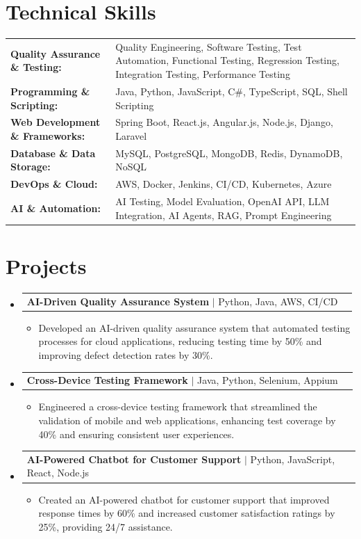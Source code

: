\documentclass[letterpaper,10pt]{article}
\makeatletter
\newcommand{\resumeItem}[1]{
  \item{\fontsize{8pt}{9pt}\selectfont
    #1 \vspace{-3pt}
  }
}
\newcommand{\resumeProjectHeading}[2]{
    \item
    \begin{tabular*}{1.001\textwidth}{l@{\extracolsep{\fill}}r}
      \fontsize{8.5pt}{10pt}#1 & \textbf{\fontsize{8.5pt}{10pt} #2}\\
    \end{tabular*}\vspace{-7pt}
}
\newcommand{\resumeSubHeadingListStart}{\begin{itemize}[leftmargin=0pt, label={}]}
\newcommand{\resumeSubHeadingListEnd}{\end{itemize}}
\newcommand{\resumeItemListStart}{\begin{itemize}[leftmargin=*]}
\newcommand{\resumeItemListEnd}{\end{itemize}\vspace{-5pt}}
\makeatother
\begin{document}
\section{Technical Skills}
        \vspace{-14pt}
        \begin{table}[h]
            \fontsize{8pt}{9pt}\selectfont
            \begin{tabular}{p{0.3\linewidth} p{0.7\linewidth}}
                \textbf{Quality Assurance \& Testing:} & Quality Engineering, Software Testing, Test Automation, Functional Testing, Regression Testing, Integration Testing, Performance Testing \\
                \textbf{Programming \& Scripting:} & Java, Python, JavaScript, C\#, TypeScript, SQL, Shell Scripting \\
                \textbf{Web Development \& Frameworks:} & Spring Boot, React.js, Angular.js, Node.js, Django, Laravel \\
                \textbf{Database \& Data Storage:} & MySQL, PostgreSQL, MongoDB, Redis, DynamoDB, NoSQL \\
                \textbf{DevOps \& Cloud:} & AWS, Docker, Jenkins, CI/CD, Kubernetes, Azure \\
                \textbf{AI \& Automation:} & AI Testing, Model Evaluation, OpenAI API, LLM Integration, AI Agents, RAG, Prompt Engineering \\
            \end{tabular}
        \end{table}
 \vspace{-18pt}

\section{Projects}
    \vspace{-5pt}
    \resumeSubHeadingListStart
          \resumeProjectHeading
            {\textbf{AI-Driven Quality Assurance System} $|$ Python, Java, AWS, CI/CD}{}
            \resumeItemListStart
                \resumeItem{Developed an AI-driven quality assurance system that automated testing processes for cloud applications, reducing testing time by 50\% and improving defect detection rates by 30\%.}
            \resumeItemListEnd
        \vspace{-12pt}
    
        \resumeProjectHeading
            {\textbf{Cross-Device Testing Framework} $|$ Java, Python, Selenium, Appium}{}
        \resumeItemListStart
                \resumeItem{Engineered a cross-device testing framework that streamlined the validation of mobile and web applications, enhancing test coverage by 40\% and ensuring consistent user experiences.}
        \resumeItemListEnd
      \vspace{-12pt}
      \resumeProjectHeading
        {\textbf{AI-Powered Chatbot for Customer Support} $|$ Python, JavaScript, React, Node.js}{}
    \resumeItemListStart
            \resumeItem{Created an AI-powered chatbot for customer support that improved response times by 60\% and increased customer satisfaction ratings by 25\%, providing 24/7 assistance.}
    \resumeItemListEnd
    \resumeSubHeadingListEnd
\end{document}

